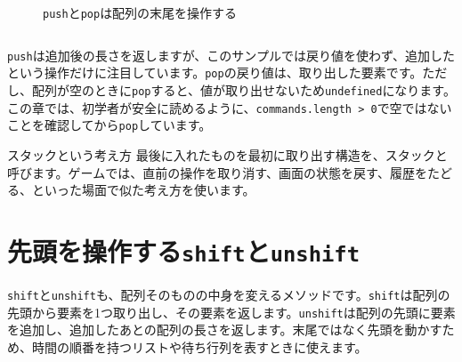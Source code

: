 \begin{figure}[htbp]
    \centering
    \caption{\texttt{push}と\texttt{pop}は配列の末尾を操作する}
    \label{fig:chapter18-iteration-push-pop}
\end{figure}

\begin{listing}[htbp]
\inputminted{ts}{typescript-p5/listings/chapter18-iteration/push-pop-stack.ts}
\caption{\texttt{push}と\texttt{pop}で操作履歴を扱う（\texttt{chapter18-iteration/push-pop-stack.ts}）}
\label{lst:chapter18-iteration-push-pop-stack}
\end{listing}

\texttt{push}は追加後の長さを返しますが、このサンプルでは戻り値を使わず、追加したという操作だけに注目しています。\texttt{pop}の戻り値は、取り出した要素です。ただし、配列が空のときに\texttt{pop}すると、値が取り出せないため\texttt{undefined}になります。この章では、初学者が安全に読めるように、\texttt{commands.length > 0}で空ではないことを確認してから\texttt{pop}しています。

\begin{pointbox}{スタックという考え方}
最後に入れたものを最初に取り出す構造を、スタックと呼びます。ゲームでは、直前の操作を取り消す、画面の状態を戻す、履歴をたどる、といった場面で似た考え方を使います。
\end{pointbox}

\section{先頭を操作する\texttt{shift}と\texttt{unshift}}

\texttt{shift}と\texttt{unshift}も、配列そのものの中身を変えるメソッドです。\texttt{shift}は配列の先頭から要素を1つ取り出し、その要素を返します。\texttt{unshift}は配列の先頭に要素を追加し、追加したあとの配列の長さを返します。末尾ではなく先頭を動かすため、時間の順番を持つリストや待ち行列を表すときに使えます。

